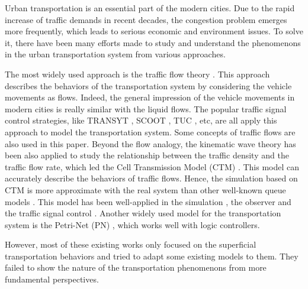 \documentclass[preprint,authoryear,12pt]{elsarticle}
\begin{document}
Urban transportation is an essential part of the modern cities. Due
to the rapid increase of traffic demands in recent decades, the
congestion problem emerges more frequently, which leads to serious
economic and environment issues. To solve it, there have been many
efforts made to study and understand the phenomenons in the urban
transportation system from various approaches.

The most widely used approach is the traffic flow theory
\citep{nathan_h_gartner_revised_2005}. This approach describes the
behaviors of the transportation system by considering the vehicle
movements as flows. Indeed, the general impression of the vehicle
movements in modern cities is really similar with the liquid flows.
The popular traffic signal control strategies, like TRANSYT
\citep{robertson_tansyt_1969,hale_traffic_2005}, SCOOT
\citep{bretherton_r_d_scoot_1982}, TUC
\citep{diakaki_multivariable_2002}, etc, are all apply this approach
to model the transportation system. Some concepts of traffic flows
are also used in this paper. Beyond the flow analogy, the kinematic
wave theory has been also applied to study the relationship between
the traffic density and the traffic flow rate, which led the Cell
Transmission Model (CTM)
\citep{daganzo_cell_1995,flotterod_operational_2011}. This model can
accurately describe the behaviors of traffic flows. Hence, the
simulation based on CTM is more approximate with the real system than
other well-known queue models \citep{almasri_online_2005}. This model
has been well-applied in the simulation \citep{Su2013}, the observer
\citep{CanudasdeWit2012} and the traffic signal control
\citep{Pohlmann2010}. Another widely used model for the
transportation system is the Petri-Net (PN)
\citep{dotoli_urban_2006,ng_review_2013}, which works well with logic
controllers.

However, most of these existing works only focused on the superficial
transportation behaviors and tried to adapt some existing models to
them. They failed to show the nature of the transportation
phenomenons from more fundamental perspectives.
\end{document}
